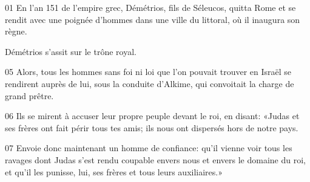 01 En l’an 151 de l’empire grec, Démétrios, fils de Séleucos, quitta Rome et se rendit avec une poignée d’hommes dans une ville du littoral, où il inaugura son règne.

Démétrios s’assit sur le trône royal.

05 Alors, tous les hommes sans foi ni loi que l’on pouvait trouver en Israël se rendirent auprès de lui, sous la conduite d’Alkime, qui convoitait la charge de grand prêtre.

06 Ils se mirent à accuser leur propre peuple devant le roi, en disant: «Judas et ses frères ont fait périr tous tes amis; ils nous ont dispersés hors de notre pays.

07 Envoie donc maintenant un homme de confiance: qu’il vienne voir tous les ravages dont Judas s’est rendu coupable envers nous et envers le domaine du roi, et qu’il les punisse, lui, ses frères et tous leurs auxiliaires.»